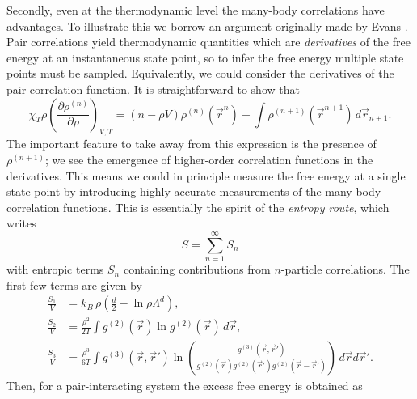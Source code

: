 \documentclass[11pt,twoside]{report}
\begin{document}
Secondly, even at the thermodynamic level the many-body correlations have advantages.
To illustrate this we borrow an argument originally made by Evans \cite{EvansPrivate2019}.
Pair correlations yield thermodynamic quantities which are \emph{derivatives} of the free energy at an instantaneous state point, so to infer the free energy multiple state points must be sampled.
Equivalently, we could consider the derivatives of the pair correlation function.
It is straightforward to show that \cite{Santos2016}
\begin{equation}\label{eq:correlation-derivatives}
  \chi_T \rho
  \left( \frac{\partial \rho^{(n)}}{\partial \rho} \right)_{V,T}
  =
  (n - \rho V) \rho^{(n)}(\vec{r}^n)
  + \int \rho^{(n+1)}(\vec{r}^{n+1}) \, d\vec{r}_{n+1}.
\end{equation}
The important feature to take away from this expression is the presence of $\rho^{(n+1)}$; we see the emergence of higher-order correlation functions in the derivatives.
This means we could in principle measure the free energy at a single state point by introducing highly accurate measurements of the many-body correlation functions.
This is essentially the spirit of the \emph{entropy route}, which writes \cite{WallaceJCP1987}
\begin{equation}
  S = \sum_{n=1}^\infty S_n
\end{equation}
with entropic terms $S_n$ containing contributions from $n$-particle correlations.
The first few terms are given by \cite{WallaceJCP1987}
\begin{subequations}
  \begin{align}
    \frac{S_1}{V}%
    &=
    k_B \, \rho \left( \frac{d}{2} - \ln{\rho \Lambda^d} \right),
    \\
    \frac{S_2}{V}%
    &=
    \frac{\rho^2}{2 T}
    \int g^{(2)}(\vec{r}) \ln{g^{(2)}(\vec{r})}
    \, d\vec{r},
    \\
    \frac{S_3}{V}%
    &=
    \frac{\rho^3}{6 T}
    \int g^{(3)}(\vec{r}, \vec{r}')
    \ln{\left(
      \frac{
        g^{(3)}(\vec{r}, \vec{r}')
      }{
        g^{(2)}(\vec{r}) g^{(2)}(\vec{r}') g^{(2)}(\vec{r} - \vec{r}')
      }
      \right)}
    \, d\vec{r} d\vec{r}'.
  \end{align}
\end{subequations}
Then, for a pair-interacting system the excess free energy is obtained as
\end{document}
